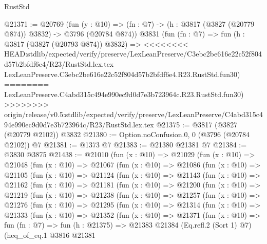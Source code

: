 \begin{lexlean}{RustStd}
\begin{coremodule}
{\begin{coremodule}
{{{{{{{{{{{{{{{{{{{{{{{{{{{{{{{{{{{@21371 := @20769
    (fun (y : @10) => (fn : @7) -> (h : @3817 (@3827 (@20779 @874)) @3832) -> @3796 (@20784 @874))
    @3831
    (fun (fn : @7) =>
    fun (h : @3817 (@3827 (@20793 @874)) @3832) =>
<<<<<<<< HEAD:stdlib/expected/verify/preserve/LexLeanPreserve/C3ebc2be616e22c52f804d57b2bfdf6e4/R23/RustStd.lex.tex
    LexLeanPreserve.C3ebc2be616e22c52f804d57b2bfdf6e4.R23.RustStd.fun30)
========
    LexLeanPreserve.C4abd315c494e990ec9d0d7e3b723964c.R23.RustStd.fun30)
>>>>>>>> origin/release/v0.5:stdlib/expected/verify/preserve/LexLeanPreserve/C4abd315c494e990ec9d0d7e3b723964c/R23/RustStd.lex.tex
@21375 := @3817 (@3827 (@20779 @2102)) @3832
@21380 := Option.noConfusion.{0, 0} (@3796 (@20784 @2102)) @7
@21381 := @1373 @7
@21383 := @21380 @21381 @7
@21384 := @3830 @3875
@21438 := @21010
    (fun (x : @10) =>
    @21029
      (fun (x : @10) =>
      @21048
        (fun (x : @10) =>
        @21067
          (fun (x : @10) =>
          @21086
            (fun (x : @10) =>
            @21105
              (fun (x : @10) =>
              @21124
                (fun (x : @10) =>
                @21143
                  (fun (x : @10) =>
                  @21162
                    (fun (x : @10) =>
                    @21181
                      (fun (x : @10) =>
                      @21200
                        (fun (x : @10) =>
                        @21219
                          (fun (x : @10) =>
                          @21238
                            (fun (x : @10) =>
                            @21257
                              (fun (x : @10) =>
                              @21276
                                (fun (x : @10) =>
                                @21295
                                  (fun (x : @10) =>
                                  @21314
                                    (fun (x : @10) =>
                                    @21333
                                      (fun (x : @10) =>
                                      @21352
                                        (fun (x : @10) =>
                                        @21371
                                          (fun (x : @10) =>
                                          fun (fn : @7) =>
                                          fun (h : @21375) =>
                                          @21383
                                            @21384
                                            (Eq.refl.{2} (Sort 1) @7)
                                            (heq_of_eq.{1}
                                              @3816
                                              @21381
}}}}}}}}}}}}}}}}}}}}}}}}}}}}}}}}}}}
\end{coremodule}}
\end{coremodule}
\end{lexlean}
